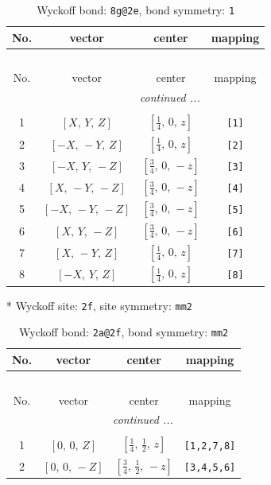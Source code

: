 \documentclass[fleqn,8pt]{jsarticle}
\begin{document}
\renewcommand{\arraystretch}{1.2}
\begin{longtable}{cccc}
\caption{Wyckoff bond: {\tt 8g@2e}, bond symmetry: {\tt 1}}
 \\
 \hline \hline
No. & vector & center & mapping \\ \hline \endfirsthead

\multicolumn{3}{l}{\tablename\ \thetable{}} \\
 \hline \hline
No. & vector & center & mapping \\ \hline \endhead

 \hline \hline
\multicolumn{3}{r}{\footnotesize\it continued ...} \\ \endfoot

 \hline \hline
\multicolumn{3}{r}{} \\ \endlastfoot

1 & $\left[ X,\, Y,\, Z \right]$ & $\left[ \frac{1}{4},\, 0,\, z \right]$ & {\tt [1]} \\ \hline
2 & $\left[ - X,\, - Y,\, Z \right]$ & $\left[ \frac{1}{4},\, 0,\, z \right]$ & {\tt [2]} \\ \hline
3 & $\left[ - X,\, Y,\, - Z \right]$ & $\left[ \frac{3}{4},\, 0,\, - z \right]$ & {\tt [3]} \\ \hline
4 & $\left[ X,\, - Y,\, - Z \right]$ & $\left[ \frac{3}{4},\, 0,\, - z \right]$ & {\tt [4]} \\ \hline
5 & $\left[ - X,\, - Y,\, - Z \right]$ & $\left[ \frac{3}{4},\, 0,\, - z \right]$ & {\tt [5]} \\ \hline
6 & $\left[ X,\, Y,\, - Z \right]$ & $\left[ \frac{3}{4},\, 0,\, - z \right]$ & {\tt [6]} \\ \hline
7 & $\left[ X,\, - Y,\, Z \right]$ & $\left[ \frac{1}{4},\, 0,\, z \right]$ & {\tt [7]} \\ \hline
8 & $\left[ - X,\, Y,\, Z \right]$ & $\left[ \frac{1}{4},\, 0,\, z \right]$ & {\tt [8]} \\
\end{longtable}
* Wyckoff site: {\tt 2f}, site symmetry: {\tt mm2}
\renewcommand{\arraystretch}{1.2}
\begin{longtable}{cccc}
\caption{Wyckoff bond: {\tt 2a@2f}, bond symmetry: {\tt mm2}}
 \\
 \hline \hline
No. & vector & center & mapping \\ \hline \endfirsthead

\multicolumn{3}{l}{\tablename\ \thetable{}} \\
 \hline \hline
No. & vector & center & mapping \\ \hline \endhead

 \hline \hline
\multicolumn{3}{r}{\footnotesize\it continued ...} \\ \endfoot

 \hline \hline
\multicolumn{3}{r}{} \\ \endlastfoot

1 & $\left[ 0,\, 0,\, Z \right]$ & $\left[ \frac{1}{4},\, \frac{1}{2},\, z \right]$ & {\tt [1,2,7,8]} \\ \hline
2 & $\left[ 0,\, 0,\, - Z \right]$ & $\left[ \frac{3}{4},\, \frac{1}{2},\, - z \right]$ & {\tt [3,4,5,6]} \\
\end{longtable}
\end{document}
